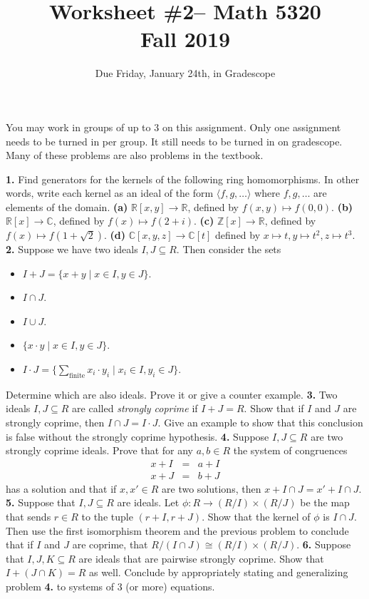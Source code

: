 \documentclass[10pt]{amsart}
\theoremstyle{theorem}
\renewcommand{\to}[1][]{\xrightarrow{\ #1\ }}
\newcommand{\bR}{{\mathbb{R}}}
\newcommand{\bZ}{\mathbb{Z}}
\newcommand{\bC}{\mathbb{C}}
\begin{document}
\title{Worksheet \#2-- Math 5320\\Fall 2019}
\author{Due Friday, January 24th, in Gradescope}

\maketitle
You may work in groups of up to 3 on this assignment.  Only one assignment needs to be turned in per group.  It still needs to be turned in on gradescope.  Many of these problems are also problems in the textbook.

\noindent
{\bf 1.}  Find generators for the kernels of the following ring homomorphisms.  In other words, write each kernel as an ideal of the form $\langle f, g, \dots\rangle$ where $f, g, \dots$ are elements of the domain.
\vskip 3pt
{\bf (a)}  $\bR[x,y] \to \bR$, defined by $f(x,y) \mapsto f(0,0)$.
\vskip 110pt
{\bf (b)}  $\bR[x] \to \bC$, defined by $f(x) \mapsto f(2+i)$.
\vskip 110pt
{\bf (c)}  $\bZ[x] \to \bR$, defined by $f(x) \mapsto f(1+\sqrt{2})$.
\vskip 110pt
{\bf (d)}  $\bC[x,y,z] \to \bC[t]$ defined by $x \mapsto t, y \mapsto t^2, z \mapsto t^3$.
\newpage
\noindent
{\bf 2.}  Suppose we have two ideals $I, J \subseteq R$.  Then consider the sets
\begin{itemize}
    \item[(a)] $I + J = \{ x + y \;|\; x \in I, y \in J\}$.
    \item[(b)] $I \cap J$.
    \item[(c)] $I \cup J$.
    \item[(d)] $\{x\cdot y \;|\; x \in I, y \in J\}$.
    \item[(e)] $I \cdot J = \big\{\sum_{\text{finite}} x_i \cdot y_i \;\big|\; x_i \in I, y_i \in J \big\}$.
\end{itemize} 
Determine which are also ideals.  Prove it or give a counter example.
\newpage
\noindent
{\bf 3.}  Two ideals $I, J \subseteq R$ are called \emph{strongly coprime} if $I + J = R$.  Show that if $I$ and $J$ are strongly coprime, then $I \cap J = I \cdot J$.  Give an example to show that this conclusion is false without the strongly coprime hypothesis.  
\newpage
\noindent
{\bf 4.}  Suppose $I,J \subseteq R$ are two strongly coprime ideals.  Prove that for any $a,b \in R$ the system of congruences
\[
    \begin{array}{rcl}
        x + I & = & a + I\\
        x + J & = & b + J
    \end{array}
\]
has a solution and that if $x, x' \in R$ are two solutions, then $x + I \cap J = x' + I \cap J$.
\newpage
\noindent
{\bf 5.}  Suppose that $I, J \subseteq R$ are ideals.  Let $\phi : R \to (R/I) \times (R/J)$ be the map that sends $r \in R$ to the tuple $(r + I, r+J)$.  Show that the kernel of $\phi$ is $I \cap J$.  Then use the first isomorphism theorem and the previous problem to conclude that if $I$ and $J$ are coprime, that $R /(I \cap J) \cong (R/I) \times (R/J)$.
\newpage
\noindent
{\bf 6.}  Suppose that $I, J, K \subseteq R$ are ideals that are pairwise strongly coprime.  Show that $I + (J \cap K) = R$ as well.  Conclude by appropriately stating and generalizing problem {\bf 4.} to systems of 3 (or more) equations.
\end{document}

